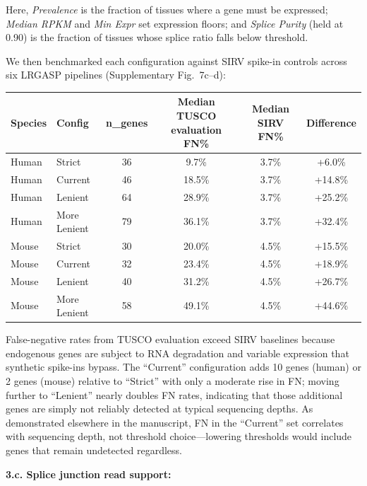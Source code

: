 \documentclass[11pt]{article}
\newcommand{\tuscoEvaluation}{TUSCO evaluation}
\begin{document}
\begin{responseboxnew}
\vspace{0.2cm}
Here, \emph{Prevalence} is the fraction of tissues where a gene must be expressed; \emph{Median RPKM} and \emph{Min Expr} set expression floors; and \emph{Splice Purity} (held at 0.90) is the fraction of tissues whose splice ratio falls below threshold.

We then benchmarked each configuration against SIRV spike-in controls across six LRGASP pipelines (Supplementary Fig.~7c--d):

\vspace{0.2cm}
\begin{center}
\small
\begin{tabular}{llcccc}
\toprule
Species & Config & n\_genes & Median \tuscoEvaluation{} FN\% & Median SIRV FN\% & Difference \\
\midrule
Human & Strict       & 36 & 9.7\%  & 3.7\% & +6.0\% \\
Human & Current      & 46 & 18.5\% & 3.7\% & +14.8\% \\
Human & Lenient      & 64 & 28.9\% & 3.7\% & +25.2\% \\
Human & More Lenient & 79 & 36.1\% & 3.7\% & +32.4\% \\
\midrule
Mouse & Strict       & 30 & 20.0\% & 4.5\% & +15.5\% \\
Mouse & Current      & 32 & 23.4\% & 4.5\% & +18.9\% \\
Mouse & Lenient      & 40 & 31.2\% & 4.5\% & +26.7\% \\
Mouse & More Lenient & 58 & 49.1\% & 4.5\% & +44.6\% \\
\bottomrule
\end{tabular}
\end{center}

\vspace{0.2cm}
False-negative rates from TUSCO evaluation exceed SIRV baselines because endogenous genes are subject to RNA degradation and variable expression that synthetic spike-ins bypass. The ``Current'' configuration adds 10 genes (human) or 2 genes (mouse) relative to ``Strict'' with only a moderate rise in FN; moving further to ``Lenient'' nearly doubles FN rates, indicating that those additional genes are simply not reliably detected at typical sequencing depths. As demonstrated elsewhere in the manuscript, FN in the ``Current'' set correlates with sequencing depth, not threshold choice---lowering thresholds would include genes that remain undetected regardless.

\vspace{0.3cm}
\textbf{3.c. Splice junction read support:}


\end{responseboxnew}
\end{document}
